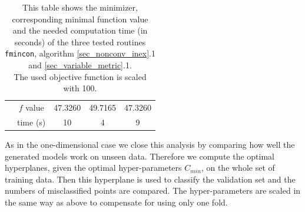 \begin{table}[H]
\begin{tabular}{|l|c|c|c|c|}
	& \(f\) value & 47.3260 & 49.7165 & 47.3260\\
	& time (s)& 10 & 4 & 9\\
	\hline
\end{tabular}
\caption[Minimizer, function value and computation time for the multigroup problem]{This table shows the minimizer, corresponding minimal function value and the needed computation time (in seconds) of the three tested routines \textup{\texttt{fmincon}}, algorithm \ref{sec_nonconv_inex}.1 and \ref{sec_variable_metric}.1.\\
The used objective function is scaled with 100.}
\label{tab_MG}
\end{table}%


As in the one-dimensional case we close this analysis by comparing how well the generated models work on unseen data.
Therefore we compute the optimal hyperplanes, given the optimal hyper-parameters \(C_{min}\), on the whole set of training data.
Then this hyperplane is used to classify the validation set and the numbers of misclassified points are compared.
The hyper-parameters are scaled in the same way as above to compensate for using only one fold.



